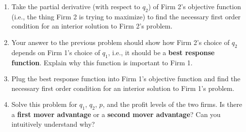 \begin{CALCULUS}
\begin{enumerate}
\begin{enumerate}
    \item Take the partial derivative (with respect to $q_2$) of Firm 2's objective function (i.e., the thing Firm 2 is trying to maximize) to find the necessary first order condition for an interior solution to Firm 2's problem.

    \item Your answer to the previous problem should show how Firm 2's choice of $q_2$ depends on Firm 1's choice of $q_1$, i.e., it should be a \textbf{best response function}. Explain why this function is important to Firm 1.

    \item Plug the best response function into Firm 1's objective function and find the necessary first order condition for an interior solution to Firm 1's problem.

    \item Solve this problem for $q_1$, $q_2$, $p$, and the profit levels of the two firms. Is there a \textbf{first mover advantage} or a \textbf{second mover advantage}? Can you intuitively understand why?
    \end{enumerate}

\end{enumerate}
\end{CALCULUS}

\renewcommand\theenumi{\arabic{chapter}.\arabic{enumi}} %



